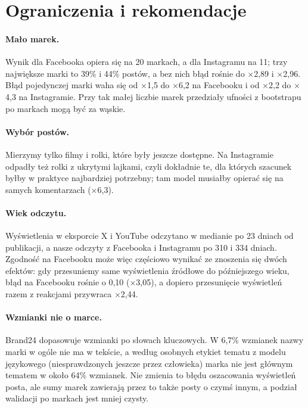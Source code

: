 \documentclass[10pt,a4paper]{article}
\newcommand{\x}[1]{$\times$#1}
\begin{document}
\section{Ograniczenia i rekomendacje}\label{sec:lim}

\paragraph{Mało marek.} Wynik dla Facebooka opiera się na 20 markach, a dla Instagramu na 11; trzy największe marki to
39\% i 44\% postów, a bez nich błąd rośnie do \x{2,89} i \x{2,96}. Błąd pojedynczej marki waha się od \x{1,5} do \x{6,2}
na Facebooku i od \x{2,2} do \x{4,3} na Instagramie. Przy tak małej liczbie marek przedziały ufności z bootstrapu po
markach mogą być za wąskie.

\paragraph{Wybór postów.} Mierzymy tylko filmy i rolki, które były jeszcze dostępne. Na Instagramie odpadły też rolki
z ukrytymi lajkami, czyli dokładnie te, dla których szacunek byłby w praktyce najbardziej potrzebny; tam model musiałby
opierać się na samych komentarzach (\x{6,3}).

\paragraph{Wiek odczytu.} Wyświetlenia w eksporcie X i YouTube odczytano w medianie po 23 dniach od publikacji, a nasze
odczyty z Facebooka i Instagramu po 310 i 334 dniach. Zgodność na Facebooku może więc częściowo wynikać ze znoszenia się
dwóch efektów: gdy przesuniemy same wyświetlenia źródłowe do późniejszego wieku, błąd na Facebooku rośnie o 0,10
(\x{3,05}), a dopiero przesunięcie wyświetleń razem z reakcjami przywraca \x{2,44}.

\paragraph{Wzmianki nie o marce.} Brand24 dopasowuje wzmianki po słowach kluczowych. W 6,7\% wzmianek nazwy marki
w ogóle nie ma w tekście, a według osobnych etykiet tematu z modelu językowego (niesprawdzonych jeszcze przez człowieka)
marka nie jest głównym tematem w około 64\% wzmianek. Nie zmienia to błędu oszacowania wyświetleń posta, ale sumy marek
zawierają przez to także posty o czymś innym, a podział walidacji po markach jest mniej czysty.
\end{document}
